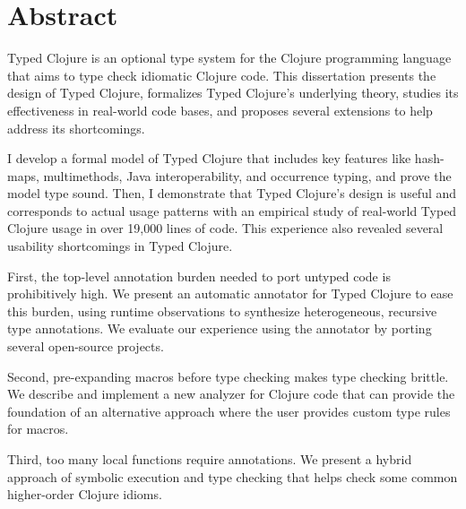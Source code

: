 \chapter*{Abstract}

Typed Clojure is an optional type system for the Clojure programming language that aims to type check idiomatic Clojure code.
This dissertation presents the design of Typed Clojure, formalizes Typed Clojure's underlying theory, studies its effectiveness
in real-world code bases, and proposes several extensions to help address its shortcomings.

I develop a formal model of Typed Clojure that includes
key features like hash-maps, multimethods, Java interoperability, and occurrence typing,
and prove the model type sound.
Then, I demonstrate that Typed Clojure's design is useful and corresponds to actual usage patterns
with an empirical study of real-world Typed Clojure usage in over 19,000 lines of code.
This experience also revealed several usability shortcomings in Typed Clojure.

First, the top-level annotation burden needed to port untyped code is prohibitively high.
We present an automatic annotator for Typed Clojure to ease this burden, using runtime
observations to synthesize heterogeneous, recursive type annotations. We evaluate our
experience using the annotator by porting several open-source projects.

Second, pre-expanding macros before type checking makes type checking brittle.
We describe and implement a new analyzer for Clojure code that can provide the
foundation of an alternative approach where the user provides custom type rules for macros.

Third, too many local functions require annotations. We present a hybrid approach of symbolic 
execution and type checking that helps check some common higher-order Clojure idioms.

